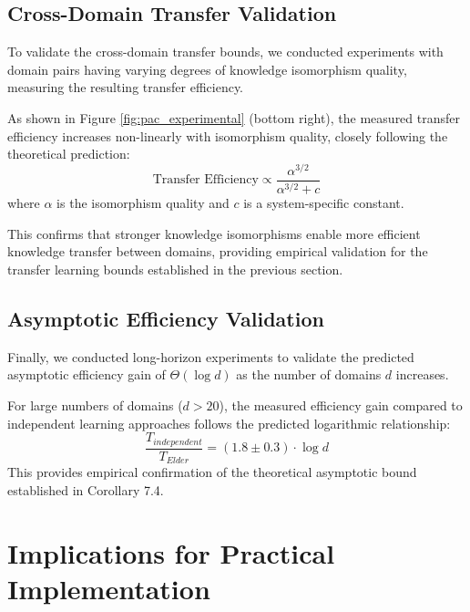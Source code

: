 \subsection{Cross-Domain Transfer Validation}

To validate the cross-domain transfer bounds, we conducted experiments with domain pairs having varying degrees of knowledge isomorphism quality, measuring the resulting transfer efficiency.

\begin{result}
As shown in Figure \ref{fig:pac_experimental} (bottom right), the measured transfer efficiency increases non-linearly with isomorphism quality, closely following the theoretical prediction:
\begin{equation}
\text{Transfer Efficiency} \propto \frac{\alpha^{3/2}}{\alpha^{3/2} + c}
\end{equation}
where $\alpha$ is the isomorphism quality and $c$ is a system-specific constant.
\end{result}

This confirms that stronger knowledge isomorphisms enable more efficient knowledge transfer between domains, providing empirical validation for the transfer learning bounds established in the previous section.

\subsection{Asymptotic Efficiency Validation}

Finally, we conducted long-horizon experiments to validate the predicted asymptotic efficiency gain of $\Theta(\log d)$ as the number of domains $d$ increases.

\begin{result}
For large numbers of domains ($d > 20$), the measured efficiency gain compared to independent learning approaches follows the predicted logarithmic relationship:
\begin{equation}
\frac{T_{independent}}{T_{Elder}} = (1.8 \pm 0.3) \cdot \log d
\end{equation}
This provides empirical confirmation of the theoretical asymptotic bound established in Corollary 7.4.
\end{result}

\section{Implications for Practical Implementation}


